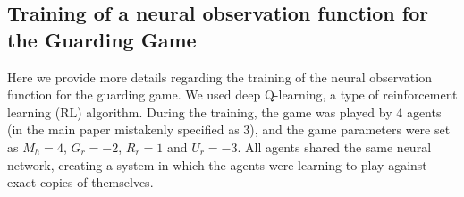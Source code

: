








\subsection*{Training of a neural observation function for the Guarding Game} 

Here we provide more details regarding the training of the neural observation
function for the guarding game.
%
We used deep Q-learning, a type of reinforcement learning (RL) algorithm.
During the training, the game was played by 4 agents (in the main paper
mistakenly specified as 3), and the game parameters were set as $M_h = 4$,
$G_r = -2$, $R_r = 1$ and $U_r = -3$.
All agents shared the same neural network, creating a system in which the
agents were learning to play against exact copies of themselves.

